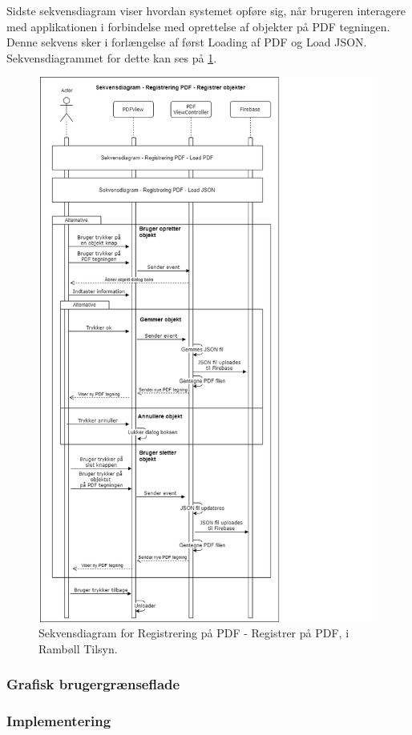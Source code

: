 Sidste sekvensdiagram viser hvordan systemet opføre sig, når brugeren interagere med applikationen i forbindelse med oprettelse af objekter på PDF tegningen. Denne sekvens sker i forlængelse af først Loading af PDF og Load JSON. Sekvensdiagrammet for dette kan ses på \ref{fig:RegistrerObjekterSekvensDiagram}.
\begin{figure}[H] %
	\centering
	\includegraphics[height=18cm, width=15cm]{../ArkitekturDesign/Design/RegisterPDF/RegistrerObjekterSekvensDiagram}
	\caption{Sekvensdiagram for Registrering på PDF - Registrer på PDF, i Rambøll Tilsyn.}
	\label{fig:RegistrerObjekterSekvensDiagram}
\end{figure}

\clearpage

\subsubsection{Grafisk brugergrænseflade}

\subsubsection{Implementering}